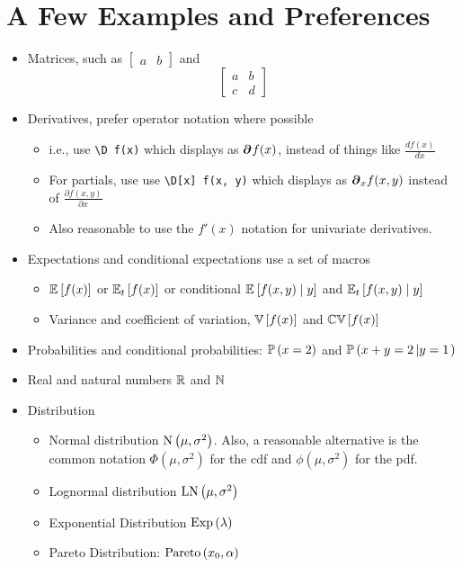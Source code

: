 \documentclass[12pt,etk-draft]{etk-article}
\begin{document}
\section{A Few Examples and Preferences}
\begin{itemize}
\item Matrices, such as $\begin{bmatrix} a & b \end{bmatrix}$ and 
\begin{equation}
\begin{bmatrix}
a & b\\
c & d
\end{bmatrix}
\end{equation}
\item Derivatives, prefer operator notation where possible
\begin{itemize}
\item i.e., use \verb!\D f(x)! which displays as $\D f(x)$, instead of things like $\frac{d f(x)}{d x}$
\item For partials, use use \verb!\D[x] f(x, y)! which displays as $\D[x] f(x, y)$ instead of $\frac{\partial f(x,y)}{\partial x}$
\item Also reasonable to use the $f'(x)$ notation for univariate derivatives.
\end{itemize}
\item Expectations and conditional expectations use a set of macros
\begin{itemize}
\item $\expec{f(x)}$ or $\expec[t]{f(x)}$ or conditional $\condexpec{f(x, y)}{y}$ and $\condexpec[t]{f(x, y)}{y}$
\item Variance and coefficient of variation, $\var{f(x)}$ and $\cv{f(x)}$
\end{itemize}
\item Probabilities and conditional probabilities: $\prob{x = 2}$ and $\cprob{x + y = 2}{y = 1}$
\item Real and natural numbers $\R$ and $\N$
\item Distribution
\begin{itemize}
\item Normal distribution $\normdist{\mu}{\sigma^2}$.  Also, a reasonable alternative is the common notation $\Phi(\mu,\sigma^2)$ for the cdf and $\phi(\mu, \sigma^2)$ for the pdf.
\item Lognormal distribution $\lognormdist{\mu}{\sigma^2}$
\item Exponential Distribution $\expdist{\lambda}$
\item Pareto Distribution: $\paretodist{x_0}{\alpha}$

\end{itemize}
\end{itemize}
\end{document}
